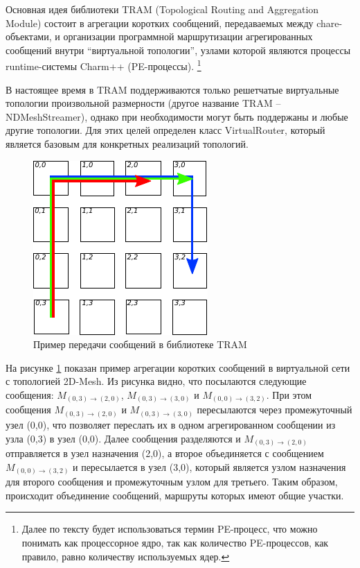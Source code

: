 \documentclass[11pt, oneside, a4paper]{article}
\newcommand\note[1]{\textcolor{green}{\tiny Note: #1}}
\begin{document}
Основная идея библиотеки TRAM (Topological Routing and Aggregation Module) состоит в агрегации коротких сообщений,
передаваемых между chare-объектами, и организации программной маршрутизации агрегированных сообщений внутри 
``виртуальной топологии'', узлами которой являются процессы runtime-системы Charm++ (PE-процессы).
\footnote{
	Далее по тексту будет использоваться термин PE-процесс, что можно понимать как процессорное ядро,
	так как количество PE-процессов, как правило, равно количеству используемых ядер.
}

В настоящее время в TRAM поддерживаются только решетчатые виртуальные топологии произвольной размерности 
(другое название TRAM -- NDMeshStreamer), 
однако при необходимости могут быть поддержаны и любые другие топологии. Для этих целей определен
класс VirtualRouter, который является базовым для конкретных реализаций топологий.

\begin{figure}[!t]
\centering
\includegraphics[width=0.4\linewidth]{img/tram_example.pdf}
\caption{Пример передачи сообщений в библиотеке TRAM}
\label{tram:example}
\end{figure}

На рисунке \ref{tram:example} показан пример агрегации коротких сообщений в виртуальной сети с топологией 2D-Mesh. Из рисунка видно, что 
посылаются следующие сообщения: $M_{(0,3)\rightarrow(2,0)}$, $M_{(0,3)\rightarrow(3,0)}$ и $M_{(0,0)\rightarrow(3,2)}$. При этом сообщения $M_{(0,3)\rightarrow(2,0)}$ 
и $M_{(0,3)\rightarrow(3,0)}$ пересылаются через промежуточный узел (0,0), что позволяет переслать их в одном агрегированном сообщении из узла (0,3) в узел (0,0).
Далее сообщения разделяются и $M_{(0,3)\rightarrow(2,0)}$ отправляется в узел назначения (2,0), а второе объединяется с сообщением $M_{(0,0)\rightarrow(3,2)}$
и пересылается в узел (3,0), который является узлом назначения для второго сообщения и промежуточным узлом для третьего. 
Таким образом, происходит объединение сообщений, маршруты которых имеют общие участки.   
\end{document}
